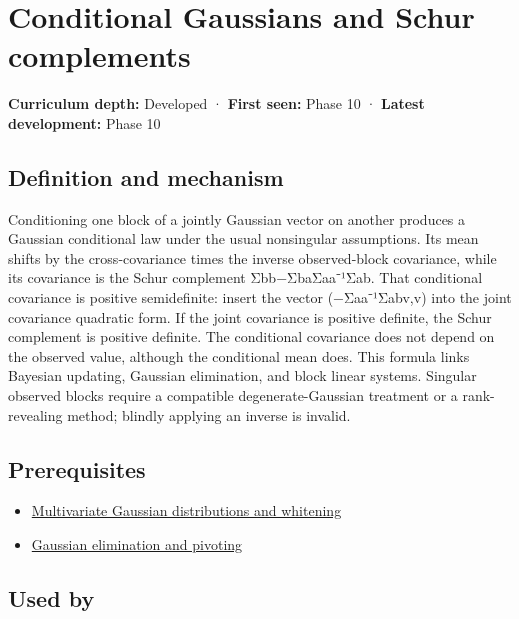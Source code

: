 \hypertarget{appendix-f0437ea55a47}{}
\section{Conditional Gaussians and Schur complements}\label{appendix-f0437ea55a47-conditional-gaussians-and-schur-complements}

\textbf{Curriculum depth:} Developed · \textbf{First seen:} Phase 10 · \textbf{Latest development:} Phase 10

\subsection{Definition and mechanism}\label{appendix-f0437ea55a47-definition-and-mechanism}

Conditioning one block of a jointly Gaussian vector on another produces a Gaussian conditional law under the usual nonsingular assumptions. Its mean shifts by the cross-covariance times the inverse observed-block covariance, while its covariance is the Schur complement Σbb−ΣbaΣaa⁻¹Σab. That conditional covariance is positive semidefinite: insert the vector (−Σaa⁻¹Σabv,v) into the joint covariance quadratic form. If the joint covariance is positive definite, the Schur complement is positive definite. The conditional covariance does not depend on the observed value, although the conditional mean does. This formula links Bayesian updating, Gaussian elimination, and block linear systems. Singular observed blocks require a compatible degenerate-Gaussian treatment or a rank-revealing method; blindly applying an inverse is invalid.

\subsection{Prerequisites}\label{appendix-f0437ea55a47-prerequisites}

\begin{itemize}
\tightlist
\item
  \hyperref[appendix-12bbe185dbe5]{Multivariate Gaussian distributions and whitening}
\item
  \hyperref[appendix-f6e77f4a200f]{Gaussian elimination and pivoting}
\end{itemize}

\subsection{Used by}\label{appendix-f0437ea55a47-used-by}


